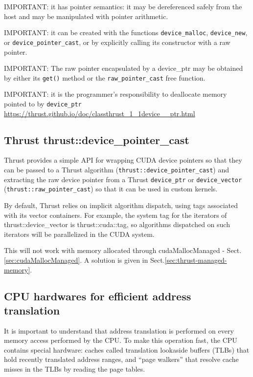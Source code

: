 IMPORTANT: it has pointer semantics: it may be dereferenced safely from the host and may be manipulated with pointer arithmetic.

IMPORTANT: it can be created with the functions \verb!device_malloc!, \verb!device_new!, or
\verb!device_pointer_cast!, or by explicitly calling its constructor with a raw
pointer.

IMPORTANT: The raw pointer encapsulated by a device_ptr may be obtained by
either its \verb!get()! method or the \verb!raw_pointer_cast! free function.

IMPORTANT: it is the programmer's responsibility to deallocate memory pointed to by \verb!device_ptr!
\url{https://thrust.github.io/doc/classthrust_1_1device__ptr.html}


\subsection{Thrust thrust::device\_pointer\_cast}

Thrust provides a simple API for wrapping CUDA device pointers so that they can
be passed to a Thrust algorithm (\verb!thrust::device_pointer_cast!) and extracting the
raw device pointer from a Thrust \verb!device_ptr! or \verb!device_vector!
(\verb!thrust::raw_pointer_cast!) so that it can be used in custom kernels.


By default, Thrust relies on implicit algorithm dispatch, using tags associated
with its vector containers. For example, the system tag for the iterators of
thrust::device_vector is thrust::cuda::tag, so algorithms dispatched on such
iterators will be parallelized in the CUDA system.

This will not work with memory allocated through cudaMallocManaged - Sect.\ref{sec:cudaMallocManaged}.
A solution is given in Sect.\ref{sec:thrust-managed-memory}.

\subsection{CPU hardwares for efficient address translation}
\label{sec:address-translation_hardwares}

It is important to understand that address translation is performed on every
memory access performed by the CPU. To make this operation fast, the CPU
contains special hardware: caches called translation lookaside buffers (TLBs)
that hold recently translated address ranges, and “page walkers” that resolve
cache misses in the TLBs by reading the page tables.

